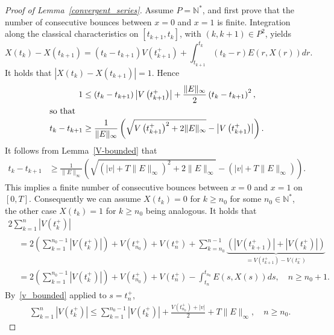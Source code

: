 \documentclass[10pt]{amsart}
\theoremstyle{definition}\newtheorem{defi}[theo]{Definition}\newtheorem{rema}[theo]{Remark}\newtheorem{exam}[theo]{Example}\newtheorem{exem}[theo]{Example}\newtheorem{nota}[theo]{Notation}
\newcommand{\N}{\mathbb{N}}
\begin{document}
\begin{proof}[{Proof of Lemma~\ref{convergent_series}}]
Assume $P=\N^*$, and first prove that the number of consecutive bounces between $x=0$ and $x=1$ is finite. Integration along the classical characteristics on $[t_{k+1}, t_k]$, with $(k,k+1)\in P^2$, yields
\[
X\left(t_k\right) - X\left(t_{k+1}\right) = \left(t_k - t_{k+1}\right) V\left(t_{k+1}^+\right) + \int_{t_{k+1}}^{t_k} \left(t_k-r\right) E(r,X(r))dr.
\]
It holds that $|X(t_k) - X(t_{k+1})|=1$. Hence
\begin{align*}
1 &\leq \left(t_k - t_{k+1}\right) \left|V\left(t_{k+1}^+\right)\right| + \frac{\|E\|_{\infty }}{2} \left(t_k - t_{k+1}\right)^2,
\\
\intertext{so that}
t_k - t_{k+1} &\geq \frac{1}{\| E \|_{\infty }} \left (\sqrt{V\left(t_{k+1}^+\right)^2 + 2\| E \|_{\infty }} - \left|V\left(t_{k+1}^+\right)\right| \right).
\end{align*}
It follows from Lemma~\ref{V-bounded} that
\begin{align*}
t_k - t_{k+1} &\geq \frac{1}{\| E \|_{\infty }} \left (\sqrt{(|v|+T\|E\|_{\infty })^2 + 2\|E\|_{\infty }} - (|v|+T\|E\|_{\infty }) \right).
\end{align*}
This implies a finite number of consecutive bounces between $x=0$ and $x=1$ on $[0,T]$. Consequently we can assume $X(t_k)=0$ for $k \geq n_0$ for some $n_0 \in \N^*$, the other case $X(t_k)=1$ for $k \geq n_0$ being analogous. It holds that
\begin{multline*}
2 \sum_{k=1}^n \left|V\left(t_k^+\right)\right|\\
\begin{aligned}
&= 2 \left(\sum_{k=1}^{n_0-1}\left|V\left(t_k^+\right)\right| \right) + V\left(t_{n_0}^+\right) + V\left(t_n^+\right) + \sum_{k=n_0}^{n-1} \underbrace{\left(\left|V\left(t_{k+1}^+\right)\right|+\left|V\left(t_k^+\right)\right|\right)}_{=V\left(t_{k+1}^+\right) - V\left(t_k^-\right)} \\
&= 2 \left(\sum_{k=1}^{n_0-1} \left|V\left(t_k^+\right)\right| \right) + V\left(t_{n_0}^+\right) + V\left(t_n^+\right) - \int_{t_n}^{t_{n_0}} E(s,X(s))ds,\quad n \geq n_0+1.
\end{aligned}
\end{multline*}
By~\eqref{v_bounded} applied to $s= t_n^+$,
\begin{align*}
&\sum_{k=1}^n \left|V\left(t_k^+\right)\right| \leq \sum_{k=1}^{n_0-1} \left|V\left(t_k^+\right)\right| + \frac{V\left(t_{n_0}^+\right)+|v|}{2} + T \| E \|_{\infty },\quad n \geq n_0.
\end{align*}
\end{proof}
\end{document}
